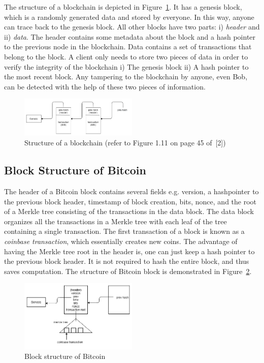 \documentclass[twoside]{article}
\renewcommand{\cite}[1]{[#1]}
\begin{document}
	The structure of a blockchain is depicted in Figure~\ref{fig:blockchain}. It has a genesis block, which is a randomly generated data and stored by everyone. In this way, anyone can trace back to the genesis block. All other blocks have two parts: i) \textit{header} and ii) \textit{data}. The header contains some metadata about the block and a hash pointer to the previous node in the blockchain. Data contains a set of transactions that belong to the block. A client only needs to store two pieces of data in order to verify the integrity of the blockchain i) The genesis block ii) A hash pointer to the most recent block. Any tampering to the blockchain by anyone, even Bob, can be detected with the help of these two pieces of information.
	
	
	\begin{figure}[h]
		\label{fig:blockchain}
		\centering
		\includegraphics[width=0.5\textwidth]{CS291D-lec2-graph1.png}
		\caption{Structure of a blockchain (refer to Figure 1.11 on page 45 of~\cite{2})}
	\end{figure}
	
	\subsection{Block Structure of Bitcoin}
	
	The header of a Bitcoin block contains several fields e.g. version, a hashpointer to the previous block header, timestamp of block creation, bits, nonce, and the root of a Merkle tree
	consisting of the transactions in the data block. The data block organizes all the transactions in a Merkle tree with each leaf of the tree containing a single transaction.
	The first transaction of a block is known as a \emph{coinbase transaction}, which essentially creates new coins. The advantage of having the Merkle tree root in the header is, one can just keep 
	a hash pointer to the previous block header. It is not required to hash the entire block, and thus saves computation. The structure of Bitcoin block is demonstrated in Figure~\ref{fig:bitcoin}.
	
	
	
	
	\begin{figure}[h]
		\label{fig:bitcoin}
		\centering
		\includegraphics[width=0.5\textwidth]{CS291D-lec2-graph2.png}
		\caption{Block structure of Bitcoin}
	\end{figure}
	
\end{document}
